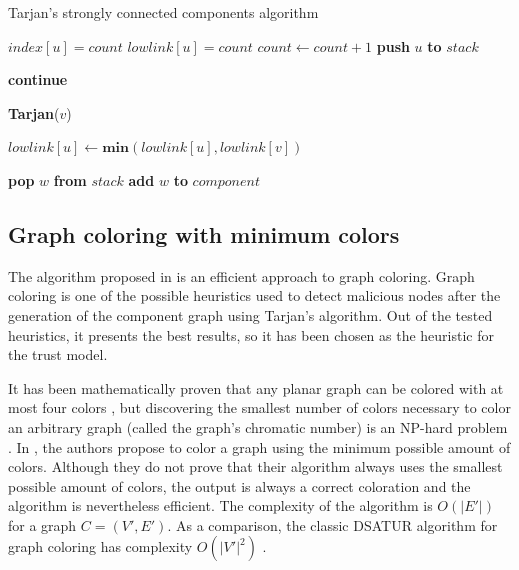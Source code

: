 \documentclass[conference]{IEEEtran}
\begin{document}
\begin{algorithm}
\caption{Tarjan's strongly connected components algorithm}\label{algorithm:tarjan}
\begin{algorithmic}[1]


\State $index[u] = count$
\State $lowlink[u] = count$
\State $count \gets count + 1$
\State \textbf{push} $u$ \textbf{to} $stack$

		\State \textbf{continue}
	\EndIf	
		
		\State \textbf{Tarjan}($v$)
	\EndIf
	
	\State $lowlink[u] \gets \textbf{min}(lowlink[u],lowlink[v])$
\EndFor

	\Repeat
		\State \textbf{pop} $w$ \textbf{from} $stack$
		\State \textbf{add} $w$ \textbf{to} $component$
\EndIf

\EndFunction
\end{algorithmic}
\end{algorithm}

\subsection{Graph coloring with minimum colors}
\label{section:coloring}
The algorithm proposed in \cite{mittal2011graph} is an efficient approach to graph coloring.
Graph coloring is one of the possible heuristics used to detect malicious nodes after the generation of the component graph using Tarjan's algorithm.
Out of the tested heuristics, it presents the best results, so it has been chosen as the heuristic for the trust model.

It has been mathematically proven that any planar graph can be colored with at most four colors \cite{appel1976every}, but discovering the smallest number of colors necessary to color an arbitrary graph (called the graph's chromatic number) is an NP-hard problem \cite{sanchez1989determining}.
In \cite{mittal2011graph}, the authors propose to color a graph using the minimum possible amount of colors.
Although they do not prove that their algorithm always uses the smallest possible amount of colors, the output is always a correct coloration and the algorithm is nevertheless efficient.
The complexity of the algorithm is $O(|E'|)$ for a graph $C = (V',E')$.
As a comparison, the classic DSATUR algorithm for graph coloring has complexity $O(|V'|^2)$ \cite{brelaz1979new}.
\end{document}
